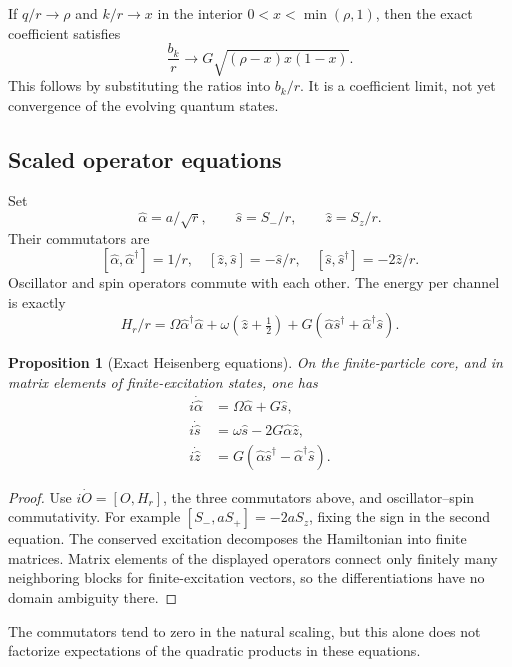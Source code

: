 \documentclass[11pt]{article}
\newtheorem{proposition}[theorem]{Proposition}
\theoremstyle{remark}
\begin{document}
If \(q/r\to\rho\) and \(k/r\to x\) in the interior
\(0<x<\min(\rho,1)\), then the exact coefficient satisfies
\[
 \frac{b_k}{r}\longrightarrow
             G\sqrt{(\rho-x)x(1-x)}.
\]
This follows by substituting the ratios into \(b_k/r\).
It is a coefficient limit, not yet convergence of the
evolving quantum states.

\subsection{Scaled operator equations}

Set
\[
 \widehat\alpha=a/\sqrt r,\qquad
 \widehat s=S_-/r,\qquad \widehat z=S_z/r.
\]
Their commutators are
\[
 [\widehat\alpha,\widehat\alpha^\dagger]=1/r,\quad
 [\widehat z,\widehat s]=-\widehat s/r,\quad
 [\widehat s,\widehat s^\dagger]=-2\widehat z/r.
\]
Oscillator and spin operators commute with each other.
The energy per channel is exactly
\[
 H_r/r=\Omega\widehat\alpha^\dagger\widehat\alpha+
 \omega(\widehat z+\tfrac12)
 +G(\widehat\alpha\widehat s^\dagger+
                         \widehat\alpha^\dagger\widehat s).
\]

\begin{proposition}[Exact Heisenberg equations]
\label{prop:v20v59-operator}
On the finite-particle core, and in matrix elements of
finite-excitation states, one has
\[
 \begin{aligned}
 i\dot{\widehat\alpha}&=\Omega\widehat\alpha+G\widehat s,\\
 i\dot{\widehat s}&=\omega\widehat s-2G\widehat\alpha\widehat z,\\
 i\dot{\widehat z}&=
       G(\widehat\alpha\widehat s^\dagger-
                             \widehat\alpha^\dagger\widehat s).
 \end{aligned}
\]
\end{proposition}
\begin{proof}
Use \(i\dot O=[O,H_r]\), the three commutators above,
and oscillator--spin commutativity.  For example
\([S_-,aS_+]=-2aS_z\), fixing the sign in the second
equation.  The conserved excitation decomposes the
Hamiltonian into finite matrices.  Matrix elements of
the displayed operators connect only finitely many
neighboring blocks for finite-excitation vectors, so
the differentiations have no domain ambiguity there.
\end{proof}

The commutators tend to zero in the natural scaling, but
this alone does not factorize expectations of the quadratic
products in these equations.
\end{document}
